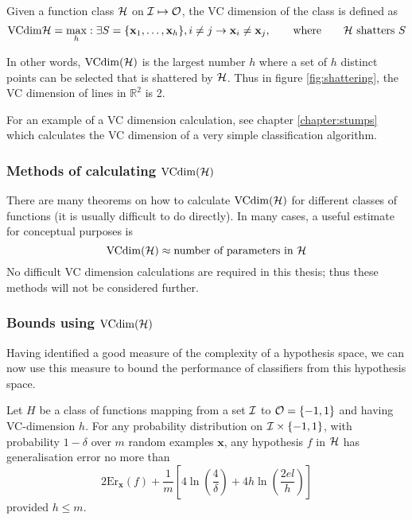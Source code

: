 \begin{definition}[VC dimension]
Given a function class $\mathcal{H}$ on $\mathcal{I} \mapsto \mathcal{O}$, the VC
dimension of the class is defined as
%
\begin{equation}
\mathrm{VCdim}{\mathcal{H}} = \max_{h} : \exists S = \{\mathbf{x}_1, \ldots, \mathbf{x}_h\},
i \neq j \rightarrow \mathbf{x}_i \neq \mathbf{x}_j,
\qquad \mbox{where} \qquad \mbox{\ensuremath{\mathcal{H}}\ shatters $S$}
\end{equation}
\end{definition}

In other words, $\mathrm{VCdim}(\mathcal{H})$ is the largest number $h$ where
a set of $h$ distinct points can be selected that is shattered by
$\mathcal{H}$.  Thus in figure \ref{fig:shattering}, the VC dimension of
lines in $\mathbb{R}^2$ is 2.

For an example of a VC dimension calculation, see
chapter \ref{chapter:stumps} which calculates the VC dimension of a
very simple classification algorithm.

\subsubsection{Methods of calculating $\mathrm{VCdim}(\mathcal{H})$}

There are many theorems on how to calculate $\mathrm{VCdim}(\mathcal{H})$ for
different classes of functions (it is usually difficult to do
directly).  In many cases, a useful estimate for conceptual purposes
is
%
\begin{equation}
\mathrm{VCdim}(\mathcal{H}) \approx \mbox{number of parameters in $\mathcal{H}$}
\end{equation}
%
No difficult VC dimension calculations are required in this thesis;
thus these methods will not be considered further.

\subsubsection{Bounds using $\mathrm{VCdim}(\mathcal{H})$}

Having identified a good measure of the complexity of a hypothesis
space, we can now use this measure to bound the performance of
classifiers from this hypothesis space.

\begin{theorem}
Let $H$ be a class of functions mapping from a set $\mathcal{I}$ to $\mathcal{O} =
\{-1, 1\}$ and having VC-dimension $h$.  For any probability
distribution on $\mathcal{I} \times \{-1,1\}$, with probability $1-\delta$
over $m$ random examples $\mathbf{x}$, any hypothesis $f$ in $\mathcal{H}$
has generalisation error no more than
\begin{equation}
2\mathrm{Er}_{\mathbf{x}}(f) + \frac{1}{m} \left[ 4 \ln 
\left( \frac{4}{\delta} \right) + 4 h \ln \left( \frac{2 e l}{h}
\right) \right]
\end{equation}
provided $h \leq m$.
\end{theorem}

